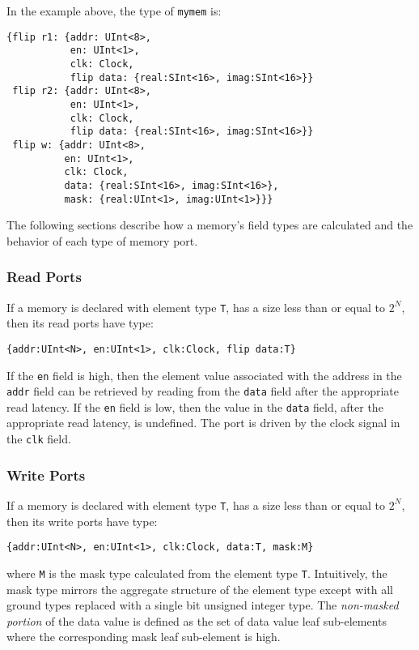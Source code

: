 \documentclass[12pt]{article}
\begin{document}
In the example above, the type of \verb|mymem| is:
\begin{lstlisting}
{flip r1: {addr: UInt<8>,
           en: UInt<1>,
           clk: Clock,
           flip data: {real:SInt<16>, imag:SInt<16>}}
 flip r2: {addr: UInt<8>,
           en: UInt<1>,
           clk: Clock,
           flip data: {real:SInt<16>, imag:SInt<16>}}
 flip w: {addr: UInt<8>,
          en: UInt<1>,
          clk: Clock,
          data: {real:SInt<16>, imag:SInt<16>},
          mask: {real:UInt<1>, imag:UInt<1>}}}
\end{lstlisting}

The following sections describe how a memory's field types are calculated and the behavior of each type of memory port.

\subsubsection{Read Ports}
If a memory is declared with element type \verb|T|, has a size less than or equal to $2^N$, then its read ports have type:
\begin{lstlisting}
{addr:UInt<N>, en:UInt<1>, clk:Clock, flip data:T}
\end{lstlisting}

If the \verb|en| field is high, then the element value associated with the address in the \verb|addr| field can be retrieved by reading from the \verb|data| field after the appropriate read latency. If the \verb|en| field is low, then the value in the \verb|data| field, after the appropriate read latency, is undefined. The port is driven by the clock signal in the \verb|clk| field.

\subsubsection{Write Ports}
If a memory is declared with element type \verb|T|, has a size less than or equal to $2^N$, then its write ports have type:
\begin{lstlisting}
{addr:UInt<N>, en:UInt<1>, clk:Clock, data:T, mask:M}
\end{lstlisting}
where \verb|M| is the mask type calculated from the element type \verb|T|. Intuitively, the mask type mirrors the aggregate structure of the element type except with all ground types replaced with a single bit unsigned integer type. The {\em non-masked portion} of the data value is defined as the set of data value leaf sub-elements where the corresponding mask leaf sub-element is high.
\end{document}
